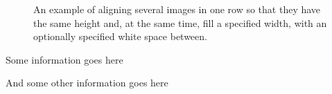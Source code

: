 \documentclass[\projectroot/template.tex]{subfiles}
\begin{document}
\blindtext


\begin{figure}
	\centering
	\begin{elasticrow}[width=.98\linewidth, sep=1em]
	\end{elasticrow}
	\caption{An example of aligning several images in one row so that they have the same height and, at the same time, fill a specified width, with an optionally specified white space between.}
\end{figure}

\begin{noteblock}
	Some information goes here
	
	And some other information goes here
\end{noteblock}

\blindtext
\end{document}
